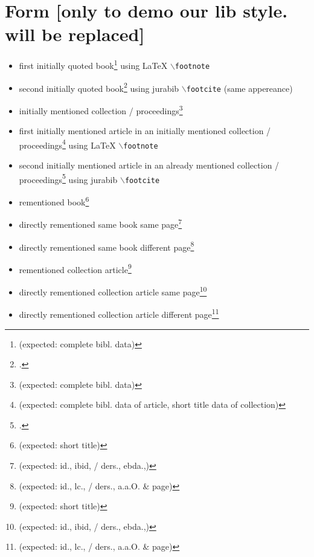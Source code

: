 \section{Form [only to demo our lib style. will be replaced]}
\begin{itemize}
  \item first initially quoted book\footnote{\cite[cf.][123ff]{Grassmuck2002a}
  (expected: complete bibl. data)} using LaTeX \texttt{$\backslash$footnote}
  \item second initially quoted book\footcite[cf.][120 (expected: complete bibl.
  data)]{Fogel2006a} using jurabib \texttt{$\backslash$footcite} (same
  appereance)
  \item initially mentioned collection /
  proceedings\footnote{\cite[cf.][123ff]{DjoGehGraKreSpi2008a} (expected: complete
  bibl. data)}
  \item first initially mentioned article in an initially mentioned collection /
  proceedings\footnote{\cite[cf.][123ff]{Spielkamp2008a} (expected: complete
  bibl. data of article, short title data of collection)} using LaTeX
  \texttt{$\backslash$footnote}
  \item second initially mentioned article in an already mentioned collection
  / proceedings\footcite[cf.][123ff (expected: complete
  bibl. data of article, short title data of collection)]{Kreutzer2008a} using
  jurabib \texttt{$\backslash$footcite} 
  \item rementioned book\footnote{\cite[cf.][120]{Fogel2006a} (expected: short
  title)}
  \item directly rementioned same book same
  page\footnote{\cite[cf.][120]{Fogel2006a} (expected: id., ibid, / ders.,
  ebda.,)}
  \item directly rementioned same book different
  page\footnote{\cite[cf.][121]{Fogel2006a} (expected: id., lc., / ders.,
  a.a.O. \& page)}
  \item rementioned collection article\footnote{\cite[cf.][120 ]{Kreutzer2008a} (expected: short
  title)}
  \item directly rementioned collection article same
  page\footnote{\cite[cf.][120]{Kreutzer2008a} (expected: id., ibid, / ders.,
  ebda.,)}
  \item directly rementioned collection article different
  page\footnote{\cite[cf.][121]{Kreutzer2008a} (expected: id., lc., / ders.,
  a.a.O. \& page)}
\end{itemize}

%
